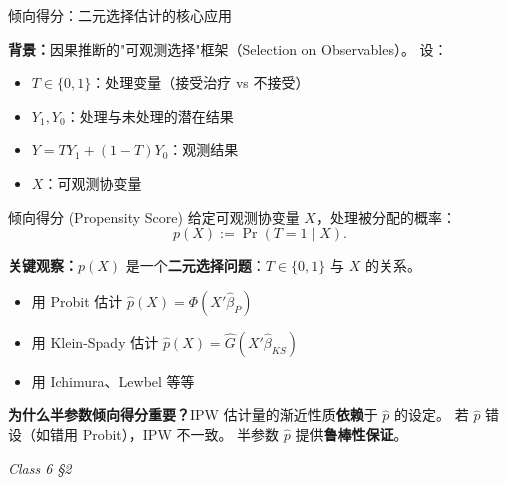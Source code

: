 \documentclass[aspectratio=169, 10pt]{beamer}
\begin{document}
\begin{frame}[shrink=12]{倾向得分：二元选择估计的核心应用}

  \textbf{背景：}因果推断的"可观测选择"框架（Selection on Observables）。
  设：
  \begin{itemize}\setlength{\itemsep}{1pt}
    \item $T \in \{0, 1\}$：处理变量（接受治疗 vs 不接受）
    \item $Y_1, Y_0$：处理与未处理的潜在结果
    \item $Y = T Y_1 + (1-T) Y_0$：观测结果
    \item $X$：可观测协变量
  \end{itemize}

  \begin{definitionbox}{{倾向得分 (Propensity Score)}}
    给定可观测协变量 $X$，处理被分配的概率：
    $$p(X) := \Pr(T = 1 \mid X).$$
  \end{definitionbox}

  \begin{highlightbox}
    \textbf{关键观察：}$p(X)$ 是一个\textbf{二元选择问题}：$T \in \{0, 1\}$ 与 $X$ 的关系。
    \begin{itemize}\setlength{\itemsep}{1pt}
      \item 用 Probit 估计 $\hat p(X) = \Phi(X'\hat\beta_P)$
      \item 用 Klein-Spady 估计 $\hat p(X) = \hat G(X'\hat\beta_{KS})$
      \item 用 Ichimura、Lewbel 等等
    \end{itemize}
  \end{highlightbox}

  \begin{keybox}
    \textbf{为什么半参数倾向得分重要？}IPW 估计量的渐近性质\textbf{依赖}于 $\hat p$ 的设定。
    若 $\hat p$ 错设（如错用 Probit），IPW 不一致。
    半参数 $\hat p$ 提供\textbf{鲁棒性保证}。
  \end{keybox}

  \hfill{\scriptsize\textit{Class 6 §2}}

\end{frame}
\end{document}
